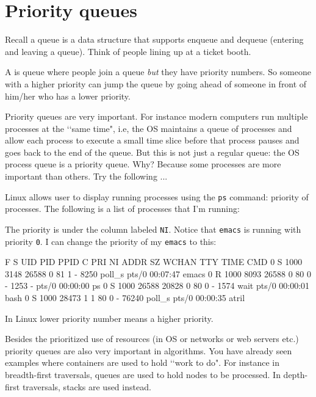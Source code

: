 \section{Priority queues}

Recall a queue is a data structure that supports
enqueue and dequeue (entering and leaving a queue).
Think of people lining up at a ticket booth.

A  is queue where people
join a queue \textit{but}
they have priority numbers.
So someone with a higher priority can jump the queue
by going ahead of someone in front of him/her
who has a lower priority.

Priority queues are very important.
For instance modern computers
run multiple processes at the \lq\lq same time", i.e,
the OS maintains a queue of processes and
allow each process to execute a small time slice
before that process pauses and goes back to the
end of the queue.
But this is not just a regular queue:
the OS process queue is a priority queue.
Why?
Because some processes are more important than others.
Try the following ...

Linux allows user to display running processes using the
\verb!ps! command:
priority of processes.
The following is a list of processes that I'm running:
{\scriptsize
{}
}
The priority is under the column labeled \texttt{NI}.
Notice that \texttt{emacs} is running with priority \texttt{0}.
I can change the priority of my \texttt{emacs} to this:
{\scriptsize
\begin{console}
F S   UID   PID  PPID  C PRI  NI ADDR SZ WCHAN  TTY          TIME CMD
0 S  1000  3148 26588  0  81   1 -  8250 poll_s pts/0    00:07:47 emacs
0 R  1000  8093 26588  0  80   0 -  1253 -      pts/0    00:00:00 ps
0 S  1000 26588 20828  0  80   0 -  1574 wait   pts/0    00:00:01 bash
0 S  1000 28473     1  1  80   0 - 76240 poll_s pts/0    00:00:35 atril
\end{console}
}
In Linux 
lower priority number
means
a higher priority.

Besides the prioritized use of resources 
(in OS or networks or web servers etc.)
priority queues are also very 
important in algorithms.
You have already seen examples where
containers are used to hold \lq\lq work to do".
For instance in breadth-first traversals, queues are used to 
hold nodes to be processed. 
In depth-first traversals, stacks are used instead.

